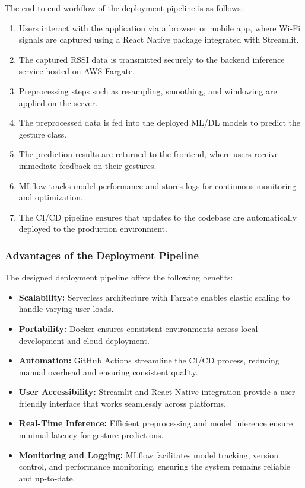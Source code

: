 \documentclass[10pt,twocolumn,letterpaper]{article}
\begin{document}
The end-to-end workflow of the deployment pipeline is as follows:
\begin{enumerate}
    \item Users interact with the application via a browser or mobile app, where Wi-Fi signals are captured using a React Native package integrated with Streamlit.
    \item The captured RSSI data is transmitted securely to the backend inference service hosted on AWS Fargate.
    \item Preprocessing steps such as resampling, smoothing, and windowing are applied on the server.
    \item The preprocessed data is fed into the deployed ML/DL models to predict the gesture class.
    \item The prediction results are returned to the frontend, where users receive immediate feedback on their gestures.
    \item MLflow tracks model performance and stores logs for continuous monitoring and optimization.
    \item The CI/CD pipeline ensures that updates to the codebase are automatically deployed to the production environment.
\end{enumerate}

\subsubsection{Advantages of the Deployment Pipeline}

The designed deployment pipeline offers the following benefits:
\begin{itemize}
    \item \textbf{Scalability:} Serverless architecture with Fargate enables elastic scaling to handle varying user loads.
    \item \textbf{Portability:} Docker ensures consistent environments across local development and cloud deployment.
    \item \textbf{Automation:} GitHub Actions streamline the CI/CD process, reducing manual overhead and ensuring consistent quality.
    \item \textbf{User Accessibility:} Streamlit and React Native integration provide a user-friendly interface that works seamlessly across platforms.
    \item \textbf{Real-Time Inference:} Efficient preprocessing and model inference ensure minimal latency for gesture predictions.
    \item \textbf{Monitoring and Logging:} MLflow facilitates model tracking, version control, and performance monitoring, ensuring the system remains reliable and up-to-date.
\end{itemize}
\end{document}
